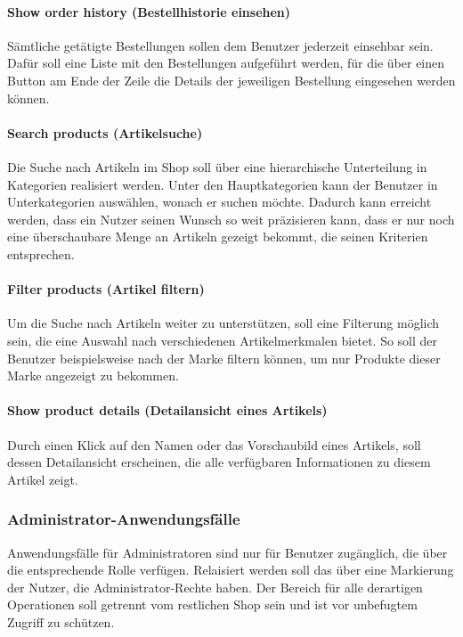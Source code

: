 \paragraph{Show order history (Bestellhistorie einsehen)}$\;$ \\
Sämtliche getätigte Bestellungen sollen dem Benutzer jederzeit einsehbar sein.
Dafür soll eine Liste mit den Bestellungen aufgeführt werden, für die über einen Button am Ende der Zeile die Details der jeweiligen Bestellung eingesehen werden können.
\paragraph{Search products (Artikelsuche)}$\;$ \\
Die Suche nach Artikeln im Shop soll über eine hierarchische Unterteilung in Kategorien realisiert werden.
Unter den Hauptkategorien kann der Benutzer in Unterkategorien auswählen, wonach er suchen möchte.
Dadurch kann erreicht werden, dass ein Nutzer seinen Wunsch so weit präzisieren kann, dass er nur noch eine überschaubare Menge an Artikeln gezeigt bekommt, die seinen Kriterien entsprechen.
\paragraph{Filter products (Artikel filtern)}$\;$ \\
Um die Suche nach Artikeln weiter zu unterstützen, soll eine Filterung möglich sein, die eine Auswahl nach verschiedenen Artikelmerkmalen bietet.
So soll der Benutzer beispielsweise nach der Marke filtern können, um nur Produkte dieser Marke angezeigt zu bekommen.
\paragraph{Show product details (Detailansicht eines Artikels)}$\;$ \\
Durch einen Klick auf den Namen oder das Vorschaubild eines Artikels, soll dessen Detailansicht erscheinen, die alle verfügbaren Informationen zu diesem Artikel zeigt.
\subsubsection{Administrator-Anwendungsfälle}
Anwendungsfälle für Administratoren sind nur für Benutzer zugänglich, die über die entsprechende Rolle verfügen. Relaisiert werden soll das über eine Markierung der Nutzer, die Administrator-Rechte haben.
Der Bereich für alle derartigen Operationen soll getrennt vom restlichen Shop sein und ist vor unbefugtem Zugriff zu schützen.
